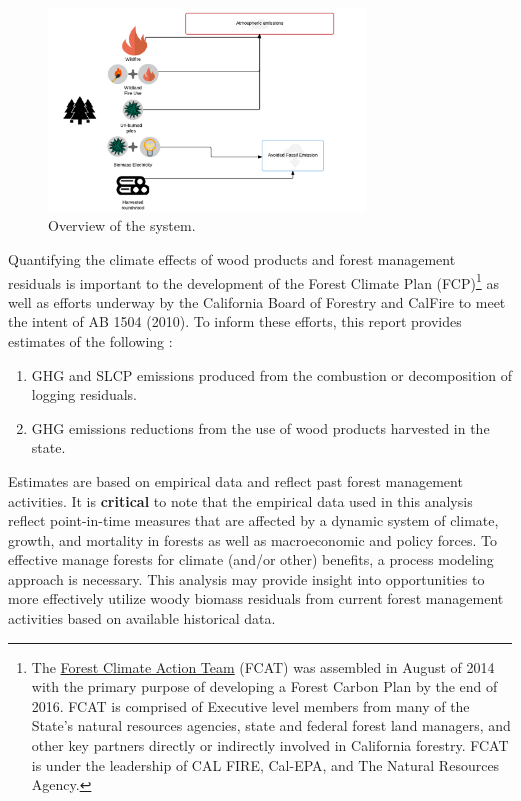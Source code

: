 \documentclass[a4paper]{article}
\begin{document}
\begin{figure}[htb]
\centering
\includegraphics[width=0.75\textwidth]{./graphics/wood_fates.pdf}
\caption{Overview of the system. \label{fig:wood_fates}}
\end{figure}


Quantifying the climate effects of wood products and forest management residuals is
important to the development of the Forest Climate Plan (FCP)\footnote{The \href{http://www.fire.ca.gov/fcat/}{Forest Climate Action Team} (FCAT) was assembled in August of 2014 with the primary purpose of developing a Forest Carbon Plan by the end of 2016. FCAT is comprised of Executive level members from many of the State’s natural resources agencies, state and federal forest land managers, and other key partners directly or indirectly involved in California forestry. FCAT is under the leadership of CAL FIRE, Cal-EPA, and The Natural Resources Agency.} as well
as efforts underway by the California Board of Forestry and CalFire to
meet the intent of AB 1504 (2010). To inform these efforts, this
report provides estimates of the following :

\begin{enumerate}
\item GHG and SLCP emissions produced from the combustion or
decomposition of logging residuals.
\item GHG emissions reductions from the use of wood products harvested in
the state.
\end{enumerate}

Estimates are based on empirical data and reflect past forest
management activities. It is \textbf{critical} to note that the empirical
data used in this analysis reflect point-in-time measures that are
affected by a dynamic system of climate, growth, and mortality in
forests as well as macroeconomic and policy forces. To effective
manage forests for climate (and/or other) benefits, a process modeling
approach is necessary. This analysis may provide insight into
opportunities to more effectively utilize woody biomass residuals from
current forest management activities based on available historical
data.
\end{document}
